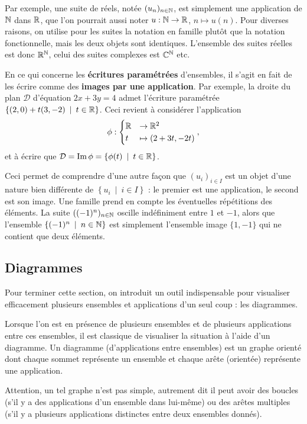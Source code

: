 Par exemple, une suite de réels, notée $(u_n)_{n\in \mathbb{N}}$, est  simplement une application de $\mathbb{N}$ dans $\mathbb{R}$, que l'on pourrait aussi noter  $u : \mathbb{N}\to \mathbb{R}$, $n\mapsto u(n)$. Pour diverses raisons, on utilise pour les suites la notation en famille plutôt que la notation fonctionnelle, mais les deux objets sont identiques. L'ensemble des suites réelles est donc $\mathbb{R}^{\mathbb{N}}$, celui des suites complexes est $\mathbb{C}^{\mathbb{N}}$ etc.

En ce qui concerne les \textbf{écritures paramétrées} d'ensembles, il s'agit en fait de les écrire comme des \textbf{images par une application}. Par exemple, la droite du plan $\mathcal D$ d'équation $2x+3y=4$ admet l'écriture paramétrée $\{(2,0)+t(3,-2)\:\mid\: t\in \R\}$. Ceci revient à considérer l'application
\[ \phi:\begin{cases} \mathbb{R} &\to \mathbb{R}^2\\ t &\mapsto (2+3t,-2t)\end{cases}
,\]
et à écrire que $\mathcal D = \Im \phi  = \{\phi(t)\:\mid\: t\in \R\}$.

Ceci permet  de comprendre d'une autre façon que $\left(u_i\right)_{i\in I}$ est un objet d'une nature bien différente de $\left\{u_i\:\mid\: i\in I\right\}$ : le premier est une application, le second est son image. Une famille prend en compte les éventuelles \og répétitions\fg{} des éléments. La suite $((-1)^n)_{n\in \mathbb{N}}$ oscille indéfiniment entre $1$ et $-1$, alors que l'ensemble $\left\{(-1)^n\:\mid\: n\in \N\right\}$ est simplement l'ensemble image $\{1,-1\}$ qui ne contient que deux éléments.

\subsection{Diagrammes}

Pour terminer cette section, on introduit un outil indispensable pour visualiser efficacement plusieurs ensembles et applications d'un seul coup : les diagrammes.

\begin{definition}[Diagramme]
Lorsque l'on est en présence de plusieurs ensembles et de plusieurs applications entre ces ensembles, il est classique de visualiser la situation à l'aide d'un diagramme. Un diagramme (d'applications entre ensembles) est un graphe orienté dont chaque sommet représente un ensemble et chaque arête (orientée) représente une application.
\end{definition}

Attention, un tel graphe n'est pas simple, autrement dit il peut avoir des boucles (s'il y a des applications d'un ensemble dans lui-même) ou des arêtes multiples (s'il y a plusieurs applications distinctes entre deux ensembles donnés).

